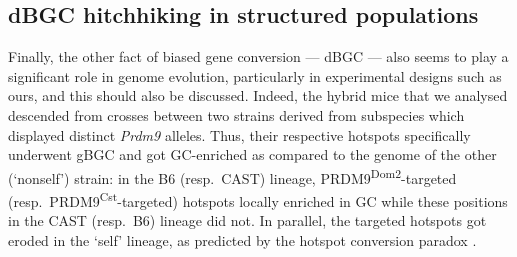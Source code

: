 \subsection{dBGC hitchhiking in structured populations}



Finally, the other fact of biased gene conversion — dBGC — also seems to play a significant role in genome evolution, particularly in experimental designs such as ours, and this should also be discussed.
Indeed, the hybrid mice that we analysed descended from crosses between two strains derived from subspecies which displayed distinct \textit{Prdm9} alleles.
Thus, their respective hotspots specifically underwent gBGC and got GC-enriched as compared to the genome of the other (‘nonself’) strain:
in the B6 (resp.\ CAST) lineage, PRDM9\textsuperscript{Dom2}-targeted (resp.\ PRDM9\textsuperscript{Cst}-targeted) hotspots locally enriched in GC while these positions in the CAST (resp.\ B6) lineage did not.
In parallel, the targeted hotspots got eroded in the ‘self’ lineage, as predicted by the hotspot conversion paradox \citep{boulton1997hotspot}.


